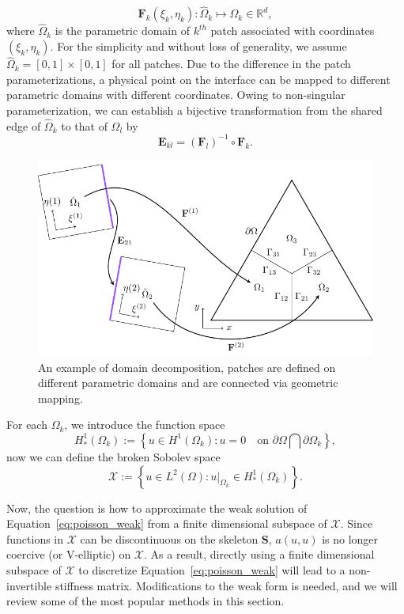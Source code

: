 \documentclass[preprint,12pt]{elsarticle}
\begin{document}
\begin{equation}
  \mathbf{F}_{k}\left(\xi_{k},\eta_{k}\right)\colon{\hat{\Omega}_k}\mapsto{{\Omega}_k}\in\mathbb{R}^d,
\end{equation}
where ${\hat{\Omega}_k}$ is the parametric domain of $k^{th}$ patch associated with coordinates $\left(\xi_{k},\eta_{k}\right)$. For the simplicity and without loss of generality, we assume ${\hat{\Omega}_k}=\left[{0,1}\right]\times\left[{0,1}\right]$ for all patches. Due to the difference in the patch parameterizations, a physical point on the interface can be mapped to different parametric domains with different coordinates. Owing to non-singular parameterization, we can establish a bijective transformation from the shared edge of $\hat{\Omega}_k$ to that of $\hat{\Omega}_l$ by 
\begin{equation}
  \mathbf{E}_{kl}=\left(\mathbf{F}_{l}\right)^{-1}\circ\mathbf{F}_{k}.
\end{equation}
\begin{figure}
    \centering
    \includegraphics[width=.8\linewidth]{patch_partition}
    \caption{An example of domain decomposition, patches are defined on different parametric domains and are connected via geometric mapping.}\label{fig:patch_partition}
\end{figure}\par
For each $\Omega_k$, we introduce the function space
\begin{equation}
    H^1_*(\Omega_k):=\left\{u\in{}H^1(\Omega_k): u=0\quad\text{on } \partial\Omega\bigcap\partial\Omega_k \right\},
\end{equation}
now we can define the broken Sobolev space 
\begin{equation}
    \mathcal{X}:=\left\{u\in{}L^2(\Omega): u\vert_{\Omega_k}\in{}H^1_*(\Omega_k)\right\}.
\end{equation}\par
Now, the question is how to approximate the weak solution of Equation~\eqref{eq:poisson_weak} from a finite dimensional subspace of $\mathcal{X}$. Since functions in $\mathcal{X}$ can be discontinuous on the skeleton $\mathbf{S}$, $a(u,u)$ is no longer coercive (or V-elliptic) on $\mathcal{X}$. As a result, directly using a finite dimensional subspace of $\mathcal{X}$ to discretize Equation~\eqref{eq:poisson_weak} will lead to a  non-invertible stiffness matrix. Modifications to the weak form is needed, and we will review some of the most popular methods in this section.
\end{document}
